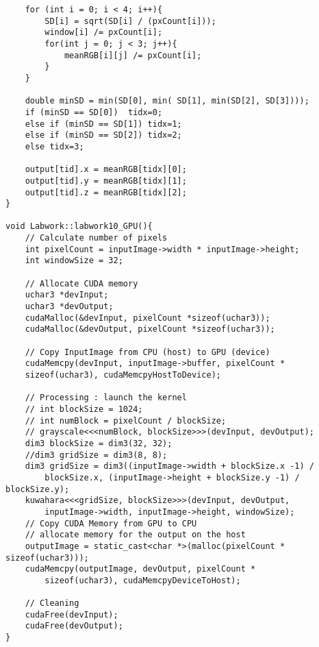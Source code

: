 \documentclass{article}
\begin{document}
\begin{enumerate}
\begin{verbatim}
    for (int i = 0; i < 4; i++){
        SD[i] = sqrt(SD[i] / (pxCount[i])); 
        window[i] /= pxCount[i];
        for(int j = 0; j < 3; j++){ 
            meanRGB[i][j] /= pxCount[i];
        }  
    } 

    double minSD = min(SD[0], min( SD[1], min(SD[2], SD[3])));
    if (minSD == SD[0])  tidx=0;
    else if (minSD == SD[1]) tidx=1;
    else if (minSD == SD[2]) tidx=2;
    else tidx=3;
    
    output[tid].x = meanRGB[tidx][0];
    output[tid].y = meanRGB[tidx][1];
    output[tid].z = meanRGB[tidx][2]; 
}

void Labwork::labwork10_GPU(){
    // Calculate number of pixels
    int pixelCount = inputImage->width * inputImage->height;
    int windowSize = 32;

    // Allocate CUDA memory
    uchar3 *devInput;
    uchar3 *devOutput;
    cudaMalloc(&devInput, pixelCount *sizeof(uchar3));
    cudaMalloc(&devOutput, pixelCount *sizeof(uchar3));

    // Copy InputImage from CPU (host) to GPU (device)
    cudaMemcpy(devInput, inputImage->buffer, pixelCount * 
    sizeof(uchar3), cudaMemcpyHostToDevice);

    // Processing : launch the kernel
    // int blockSize = 1024;
    // int numBlock = pixelCount / blockSize;  
    // grayscale<<<numBlock, blockSize>>>(devInput, devOutput);
    dim3 blockSize = dim3(32, 32);
    //dim3 gridSize = dim3(8, 8);
    dim3 gridSize = dim3((inputImage->width + blockSize.x -1) / 
        blockSize.x, (inputImage->height + blockSize.y -1) / blockSize.y);
    kuwahara<<<gridSize, blockSize>>>(devInput, devOutput, 
        inputImage->width, inputImage->height, windowSize);
    // Copy CUDA Memory from GPU to CPU
    // allocate memory for the output on the host
    outputImage = static_cast<char *>(malloc(pixelCount * sizeof(uchar3)));  
    cudaMemcpy(outputImage, devOutput, pixelCount * 
        sizeof(uchar3), cudaMemcpyDeviceToHost);   

    // Cleaning
    cudaFree(devInput);
    cudaFree(devOutput);
}
\end{verbatim}

\end{enumerate}
\end{document}
